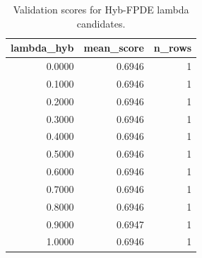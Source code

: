 \begin{table}[t]
\caption{Validation scores for Hyb-FPDE lambda candidates.}
\label{tab:lambda_distribution_computed}
\centering
\begin{tabular}{rrr}
\toprule
lambda\_hyb & mean\_score & n\_rows \\
\midrule
0.0000 & 0.6946 & 1 \\
0.1000 & 0.6946 & 1 \\
0.2000 & 0.6946 & 1 \\
0.3000 & 0.6946 & 1 \\
0.4000 & 0.6946 & 1 \\
0.5000 & 0.6946 & 1 \\
0.6000 & 0.6946 & 1 \\
0.7000 & 0.6946 & 1 \\
0.8000 & 0.6946 & 1 \\
0.9000 & 0.6947 & 1 \\
1.0000 & 0.6946 & 1 \\
\bottomrule
\end{tabular}

\end{table}
